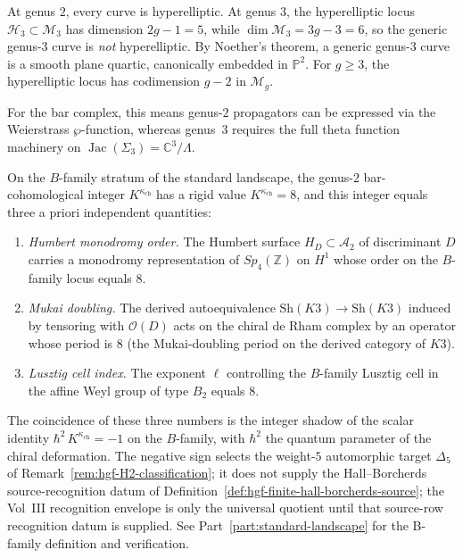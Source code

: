 \begin{remark}
\label{rem:genus3-transition}
At genus $2$, every curve is hyperelliptic. At genus $3$, the hyperelliptic locus $\mathcal{H}_3 \subset \mathcal{M}_3$ has dimension $2g-1 = 5$, while $\dim \mathcal{M}_3 = 3g-3 = 6$, so the generic genus-$3$ curve is \emph{not} hyperelliptic. By Noether's theorem, a generic genus-$3$ curve is a smooth plane quartic, canonically embedded in $\mathbb{P}^2$. For $g \geq 3$, the hyperelliptic locus has codimension $g-2$ in $\mathcal{M}_g$.

For the bar complex, this means genus-$2$ propagators can be expressed via the Weierstrass $\wp$-function, whereas genus~$3$ requires the full theta function machinery on $\operatorname{Jac}(\Sigma_3) = \mathbb{C}^3/\Lambda$.
\end{remark}

\begin{remark}
\label{rem:hgf-humbert-mukai-lusztig}
On the $B$-family stratum of the standard landscape, the genus-$2$
bar-cohomological integer $K^{\kappa_{\mathrm{ch}}}$ has a rigid
value $K^{\kappa_{\mathrm{ch}}} = 8$, and this integer equals
three a priori independent quantities:
\begin{enumerate}[label=\textup{(\roman*)}]
\item \emph{Humbert monodromy order.} The Humbert surface
$H_D \subset \mathcal{A}_2$ of discriminant $D$ carries a
monodromy representation of $Sp_4(\mathbb{Z})$ on
$H^1$ whose order on the $B$-family locus equals $8$.
\item \emph{Mukai doubling.} The derived autoequivalence
$\mathrm{Sh}(K3) \to \mathrm{Sh}(K3)$ induced by tensoring with
$\mathcal{O}(D)$ acts on the chiral de Rham complex by an
operator whose period is $8$ (the Mukai-doubling period on
the derived category of $K3$).
\item \emph{Lusztig cell index.} The exponent
$\ell$ controlling the $B$-family Lusztig cell in the affine
Weyl group of type $B_2$ equals $8$.
\end{enumerate}
The coincidence of these three numbers is the integer shadow of
the scalar identity
$\hbar^2 \, K^{\kappa_{\mathrm{ch}}} = -1$
on the $B$-family, with $\hbar^2$ the quantum parameter of the
chiral deformation. The negative sign selects the weight-$5$
automorphic target $\Delta_5$ of
Remark~\ref{rem:hgf-H2-classification}; it does not supply the
Hall--Borcherds source-recognition datum of
Definition~\ref{def:hgf-finite-hall-borcherds-source}; the Vol~III
recognition envelope is only the universal quotient until that
source-row recognition datum is supplied. See
Part~\ref{part:standard-landscape} for the B-family definition and
verification.
\end{remark}

